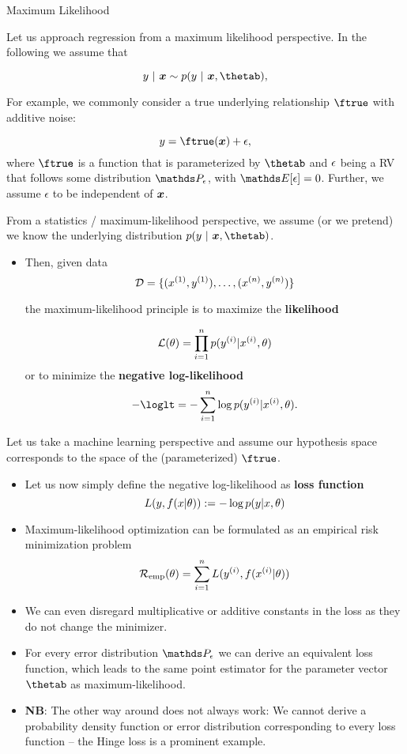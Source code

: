 \begin{vbframe}{Maximum Likelihood}

Let us approach regression from a maximum likelihood perspective. In the following we assume that 

$$
	y~|~ \xv \sim p(y~|~\xv, \thetab), 
$$

\lz 

For example, we commonly consider a true underlying relationship $\ftrue$ with additive noise: 

$$
y = \ftrue(\xv) + \eps,
$$
where $\ftrue$ is a function that is parameterized by $\thetab$ and $\epsilon$ being a RV that follows some distribution $\P_\eps$, with $\E[\eps] = 0$. Further, we assume $\epsilon$ to be independent of $\bm{x}$. 


\framebreak 

From a statistics / maximum-likelihood perspective, we assume (or we pretend) we know the underlying distribution $p(y~|~\xv, \thetab)$. 

\begin{itemize}
\item Then, given data 
$$
\mathcal{D} = \{ (x^{(1)}, y^{(1)}), \ldots, (x^{(n)}, y^{(n)})\}
$$ 

the maximum-likelihood principle is to maximize the \textbf{likelihood}

$$ \mathcal{L}(\theta) = \prod_{i=1}^n p(y^{(i)} |x^{(i)}, \theta) $$
or to minimize the \textbf{negative log-likelihood}
$$ -\loglt = -\sumin \lpdfyigxit. $$
\end{itemize}


\framebreak 

Let us take a machine learning perspective and assume our hypothesis space corresponds to the space of the (parameterized) $\ftrue$. 

\begin{itemize}
\item Let us now simply define the negative log-likelihood as \textbf{loss function} 
$$ L(y, f(x | \theta)) := - \log p(y |x, \theta) $$
\item Maximum-likelihood optimization can be formulated as an empirical risk minimization problem
$$\mathcal{R}_{\text{emp}}(\theta) = \sum_{i=1}^n L(y^{(i)}, f(x^{(i)} | \theta))$$

\item We can even disregard multiplicative or additive constants in the loss as they do not change the minimizer.

\framebreak 

\item For every error distribution $\P_\eps$ we can derive an equivalent loss function, which leads to the same point estimator for the parameter vector $\thetab$ as maximum-likelihood.
\lz
\item \textbf{NB}: The other way around does not always work: We cannot derive a probability density function or error distribution corresponding to every loss function -- the Hinge loss is a prominent example.
\end{itemize}

\end{vbframe}


